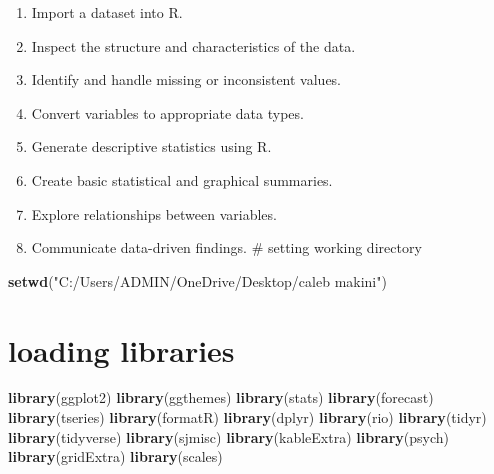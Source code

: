 \documentclass[
]{article}
\newenvironment{Shaded}{\begin{snugshade}}{\end{snugshade}}
\newcommand{\FunctionTok}[1]{\textcolor[rgb]{0.13,0.29,0.53}{\textbf{#1}}}
\newcommand{\NormalTok}[1]{#1}
\newcommand{\StringTok}[1]{\textcolor[rgb]{0.31,0.60,0.02}{#1}}
\providecommand{\tightlist}{%
  \setlength{\itemsep}{0pt}\setlength{\parskip}{0pt}}
\begin{document}
\begin{enumerate}
\def\labelenumi{\roman{enumi}.}
\tightlist
\item
  Import a dataset into R.\\
\item
  Inspect the structure and characteristics of the data.\\
\item
  Identify and handle missing or inconsistent values.\\
\item
  Convert variables to appropriate data types.\\
\item
  Generate descriptive statistics using R.\\
\item
  Create basic statistical and graphical summaries.\\
\item
  Explore relationships between variables.\\
\item
  Communicate data-driven findings. \# setting working directory
\end{enumerate}

\begin{Shaded}
\begin{Highlighting}[]
\FunctionTok{setwd}\NormalTok{(}\StringTok{"C:/Users/ADMIN/OneDrive/Desktop/caleb makini"}\NormalTok{)}
\end{Highlighting}
\end{Shaded}

\section{loading libraries}\label{loading-libraries}

\begin{Shaded}
\begin{Highlighting}[]
\FunctionTok{library}\NormalTok{(ggplot2)}
\FunctionTok{library}\NormalTok{(ggthemes)}
\FunctionTok{library}\NormalTok{(stats)}
\FunctionTok{library}\NormalTok{(forecast)}
\FunctionTok{library}\NormalTok{(tseries)}
\FunctionTok{library}\NormalTok{(formatR)}
\FunctionTok{library}\NormalTok{(dplyr)}
\FunctionTok{library}\NormalTok{(rio)}
\FunctionTok{library}\NormalTok{(tidyr)}
\FunctionTok{library}\NormalTok{(tidyverse)}
\FunctionTok{library}\NormalTok{(sjmisc)}
\FunctionTok{library}\NormalTok{(kableExtra)}
\FunctionTok{library}\NormalTok{(psych)}
\FunctionTok{library}\NormalTok{(gridExtra)}
\FunctionTok{library}\NormalTok{(scales)}
\end{Highlighting}
\end{Shaded}
\end{document}
